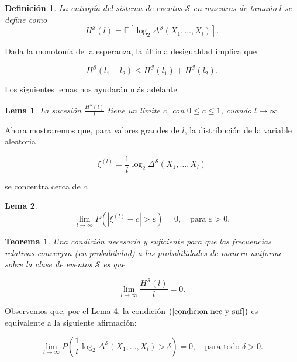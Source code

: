 \documentclass{article}
\newtheorem{thm}{Teorema}[subsection]
\newtheorem{lem}{Lema}[subsection]
\newtheorem{dfn}{Definición}[subsection]
\begin{document}
\begin{dfn}
    La entropía del sistema de eventos \( \mathcal{S} \) en muestras de tamaño \( l \) se define como  
    \[
    H^{\mathcal{S}}(l) = \mathbb{E} \left[ \log_2 \Delta^{\mathcal{S}}(X_1, \dots, X_l) \right].
    \]
    
\end{dfn}

Dada la monotonía de la esperanza, la última desigualdad implica que  

\[
H^{\mathcal{S}}(l_1 + l_2) \leq H^{\mathcal{S}}(l_1) + H^{\mathcal{S}}(l_2).
\]

Los siguientes lemas nos ayudarán más adelante.\newline

\begin{lem}
    La sucesión \( \frac{H^{\mathcal{S}}(l)}{l} \) tiene un límite \( c \), con \( 0 \leq c \leq 1 \), cuando \( l \to \infty \).
\end{lem}
    
Ahora mostraremos que, para valores grandes de \( l \), la distribución de la variable aleatoria  

\[
\xi^{(l)} = \frac{1}{l} \log_2 \Delta^{\mathcal{S}}(X_1, \dots, X_l)
\]

se concentra cerca de \( c \).
    
\begin{lem}
    \[
    \lim_{l \to \infty} P(|\xi^{(l)} - c| > \varepsilon) = 0, \quad \text{para } \varepsilon > 0.
    \]
\end{lem}

\begin{thm}
    Una condición necesaria y suficiente para que las frecuencias relativas converjan (en probabilidad) a 
    las probabilidades de manera uniforme sobre la clase de eventos \( \mathcal{S} \) es que  
    
    \begin{equation}
    \lim_{l \to \infty} \frac{H^{\mathcal{S}}(l)}{l} = 0. \label{condicion nec y suf}
    \end{equation}
\end{thm}
    
    Observemos que, por el Lema 4, la condición \((\ref{condicion nec y suf})\) es equivalente a la siguiente afirmación:  
    
\begin{equation}
    \lim_{l \to \infty} P\left( \frac{1}{l}\log_2 \Delta^{\mathcal{S}}(X_1, \dots, X_l) > \delta  \right) = 0, 
    \quad \text{para todo } \delta > 0.
\end{equation}
    
\end{document}
